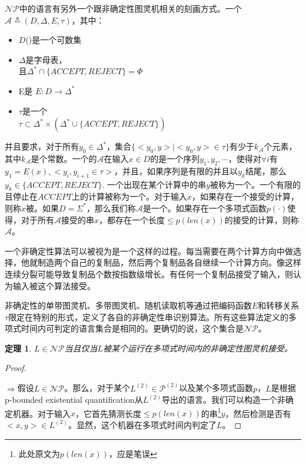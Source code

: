 \documentclass[twocolumn]{article}
\newtheorem{theorem}{\hspace{2em}定理}
\theoremstyle{nonumberplain}%
\newtheorem{proof}{\hspace{2em}证明}
\begin{document}
\begin{CJK}{UTF8}{gbsn}
    $\mathcal{NP}$中的语言有另外一个跟非确定性图灵机相关的刻画方式。一个{}$\mathcal{A}\triangleq(D,\Delta,E,\tau)$，其中：
    \begin{itemize}
    \item $D$({})是一个可数集
    \item $\Delta$是字母表， \\
        且$\Delta^*\cap \{ACCEPT,REJECT\}=\Phi$
    \item E是{} $E:D\rightarrow\Delta^*$
    \item $\tau$是一个{} \\
        $\tau\subset\Delta^*\times(\Delta^*\cup \{ACCEPT,REJECT\})$
    \end{itemize}
    并且要求，对于所有$y_0 \in \Delta^*$，集合$\{<y_0,y>|<y_0,y>\in \tau\}$有少于$k_\mathcal{A}$个元素，其中$k_\mathcal{A}$是个常数。一个的$\mathcal{A}$在输入$x\in D$的{}是一个序列$y_1,y_2,\cdots$，使得对$\forall i$有$y_1=E(x),<y_i,y_{i+1}\in\tau>$，并且，如果序列是有限的并且以$y_k$结尾，那么$y_k \in \{ACCEPT,REJECT\}$. 一个出现在某个计算中的串$y$被称为一个{}。一个有限的且停止在$ACCEPT$上的计算被称为一个{}。对于输入$x$，如果存在一个接受的计算，则称$x$被{}。如果$D=\Sigma^*$，那么我们称$\mathcal{A}$是一个{}。如果存在一个多项式函数$p(\cdot)$使得，对于所有$\mathcal{A}$接受的串$x$，都存在一个长度$\leq p(len(x))$的接受的计算，则称$\mathcal{A}${}。

    一个非确定性算法可以被视为是一个这样的过程。每当需要在两个计算方向中做选择，他就制造两个自己的复制品，然后两个复制品各自继续一个计算方向。像这样连续分裂可能导致复制品个数按指数级增长。有任何一个复制品接受了输入，则认为输入被这个算法接受。

    非确定性的单带图灵机、多带图灵机、随机读取机等通过把编码函数$E$和转移关系$\tau$限定在特别的形式，定义了各自的非确定性串识别算法。所有这些算法定义的多项式时间内可判定的语言集合是相同的。更确切的说，这个集合是$\mathcal{NP}$。

    \begin{theorem}
      $L\in \mathcal{NP}$当且仅当$L$被某个运行在多项式时间内的非确定性图灵机接受。
    \end{theorem}

    \begin{proof}
        　

        $\Rightarrow$假设$L\in\mathcal{NP}$。那么，对于某个$L^{(2)}\in\mathcal{P}^{(2)}$以及某个多项式函数$p$，$L$是根据p-bounded existential quantification从$L^{(2)}$导出的语言。我们可以构造一个非确定机器。对于输入$x$，它首先猜测长度$\leq p(len(x))$的串\footnote{此处原文为$p(len(x))$，应是笔误}$y$，然后检测是否有$<x,y>\in L^{(2)}$。显然，这个机器在多项式时间内判定了$L$。


\end{proof}
\end{CJK}
\end{document}
